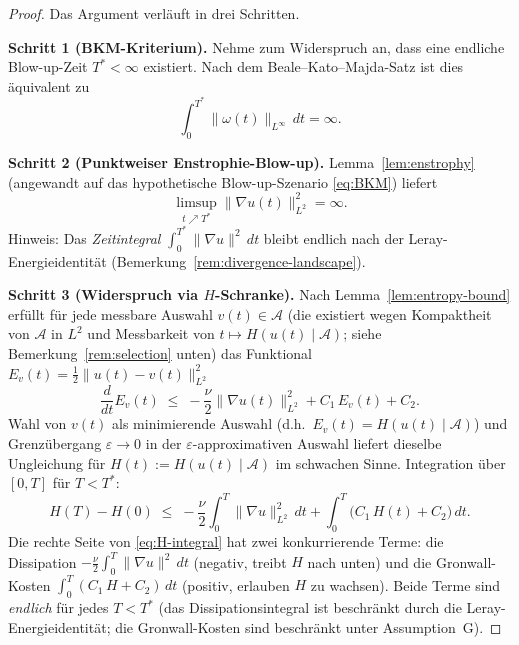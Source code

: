 \documentclass[12pt,a4paper]{article}
\theoremstyle{definition}
\theoremstyle{plain}
\theoremstyle{remark}
\begin{document}
\begin{proof}
Das Argument verläuft in drei Schritten.

\medskip
\noindent\textbf{Schritt 1 (BKM-Kriterium).} Nehme zum Widerspruch an, dass eine endliche
Blow-up-Zeit $T^* < \infty$ existiert. Nach dem Beale--Kato--Majda-Satz
\cite{BealeKatoMajda1984} ist dies äquivalent zu
\begin{equation}\label{eq:BKM}
    \int_0^{T^*}\|\omega(t)\|_{L^\infty}\,dt = \infty.
\end{equation}

\medskip
\noindent\textbf{Schritt 2 (Punktweiser Enstrophie-Blow-up).} Lemma~\ref{lem:enstrophy}
(angewandt auf das hypothetische Blow-up-Szenario \eqref{eq:BKM}) liefert
\begin{equation}\label{eq:diss-inf}
    \limsup_{t \nearrow T^*}\|\nabla u(t)\|_{L^2}^2 = \infty.
\end{equation}
Hinweis: Das \emph{Zeitintegral} $\int_0^{T^*}\|\nabla u\|^2\,dt$
bleibt endlich nach der Leray-Energieidentität
(Bemerkung~\ref{rem:divergence-landscape}).

\medskip
\noindent\textbf{Schritt 3 (Widerspruch via $H$-Schranke).}
Nach Lemma~\ref{lem:entropy-bound} erfüllt für jede messbare Auswahl
$v(t)\in\mathcal{A}$ (die existiert wegen Kompaktheit von $\mathcal{A}$ in $L^2$ und
Messbarkeit von $t\mapsto H(u(t)\mid\mathcal{A})$; siehe Bemerkung~\ref{rem:selection}
unten) das Funktional $E_v(t)=\tfrac12\|u(t)-v(t)\|_{L^2}^2$
\[
    \frac{d}{dt}E_v(t)
    \;\le\; -\frac{\nu}{2}\|\nabla u(t)\|_{L^2}^2 + C_1\,E_v(t) + C_2.
\]
Wahl von $v(t)$ als minimierende Auswahl (d.h.\ $E_v(t) = H(u(t)\mid\mathcal{A})$)
und Grenzübergang $\varepsilon\to 0$ in der $\varepsilon$-approximativen Auswahl
liefert dieselbe Ungleichung für $H(t):=H(u(t)\mid\mathcal{A})$ im schwachen Sinne.
Integration über $[0,T]$ für $T < T^*$:
\begin{equation}\label{eq:H-integral}
    H(T) - H(0)
    \;\le\;
    -\frac{\nu}{2}\int_0^T\|\nabla u\|_{L^2}^2\,dt
    + \int_0^T\!\big(C_1\,H(t) + C_2\big)\,dt.
\end{equation}
Die rechte Seite von \eqref{eq:H-integral} hat zwei konkurrierende Terme:
die Dissipation $-\tfrac{\nu}{2}\int_0^T\|\nabla u\|^2\,dt$
(negativ, treibt $H$ nach unten) und die Gronwall-Kosten
$\int_0^T(C_1\,H + C_2)\,dt$ (positiv, erlauben $H$ zu wachsen).
Beide Terme sind \emph{endlich} für jedes $T < T^*$ (das Dissipationsintegral
ist beschränkt durch die Leray-Energieidentität; die Gronwall-Kosten
sind beschränkt unter Assumption~G).


\end{proof}
\end{document}
